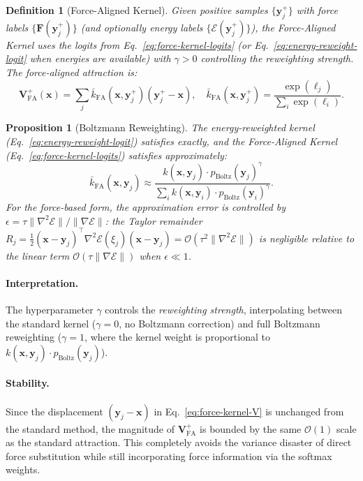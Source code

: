 \documentclass[11pt]{article}
\newtheorem{proposition}[theorem]{Proposition}
\newtheorem{definition}{Definition}[section]
\newcommand{\bx}{\mathbf{x}}
\newcommand{\by}{\mathbf{y}}
\newcommand{\bV}{\mathbf{V}}
\newcommand{\bF}{\mathbf{F}}
\newcommand{\kbar}{\bar{k}}
\newcommand{\pboltz}{p_{\text{Boltz}}}
\begin{document}
\begin{definition}[Force-Aligned Kernel]
\label{def:force-kernel}
Given positive samples $\{\by_j^+\}$ with force labels $\{\bF(\by_j^+)\}$ (and optionally energy labels $\{\mathcal{E}(\by_j^+)\}$), the Force-Aligned Kernel uses the logits from Eq.~\eqref{eq:force-kernel-logits} (or Eq.~\eqref{eq:energy-reweight-logit} when energies are available) with $\gamma > 0$ controlling the reweighting strength.
The force-aligned attraction is:
\begin{equation}
    \bV_{\text{FA}}^+(\bx) = \sum_j \kbar_{\text{FA}}(\bx, \by_j^+)(\by_j^+ - \bx), \quad \kbar_{\text{FA}}(\bx, \by_j^+) = \frac{\exp(\ell_j)}{\sum_i \exp(\ell_i)}.
    \label{eq:force-kernel-V}
\end{equation}
\end{definition}

\begin{proposition}[Boltzmann Reweighting]
\label{prop:boltzmann-reweight}
The energy-reweighted kernel (Eq.~\ref{eq:energy-reweight-logit}) satisfies exactly, and the Force-Aligned Kernel (Eq.~\ref{eq:force-kernel-logits}) satisfies approximately:
\begin{equation}
    \kbar_{\text{FA}}(\bx, \by_j) \approx \frac{k(\bx,\by_j) \cdot \pboltz(\by_j)^\gamma}{\sum_i k(\bx,\by_i) \cdot \pboltz(\by_i)^\gamma}.
    \label{eq:boltzmann-reweight}
\end{equation}
For the force-based form, the approximation error is controlled by $\epsilon = \tau\|\nabla^2\mathcal{E}\|/\|\nabla\mathcal{E}\|$: the Taylor remainder $R_j = \tfrac{1}{2}(\bx-\by_j)^\top\nabla^2\mathcal{E}(\xi_j)(\bx-\by_j) = \mathcal{O}(\tau^2\|\nabla^2\mathcal{E}\|)$ is negligible relative to the linear term $\mathcal{O}(\tau\|\nabla\mathcal{E}\|)$ when $\epsilon \ll 1$.
\end{proposition}

\paragraph{Interpretation.}
The hyperparameter $\gamma$ controls the \emph{reweighting strength}, interpolating between the standard kernel ($\gamma = 0$, no Boltzmann correction) and full Boltzmann reweighting ($\gamma = 1$, where the kernel weight is proportional to $k(\bx,\by_j)\cdot\pboltz(\by_j)$).

\paragraph{Stability.}
Since the displacement $(\by_j - \bx)$ in Eq.~\eqref{eq:force-kernel-V} is unchanged from the standard method, the magnitude of $\bV_{\text{FA}}^+$ is bounded by the same $\mathcal{O}(1)$ scale as the standard attraction.
This completely avoids the variance disaster of direct force substitution while still incorporating force information via the softmax weights.
\end{document}
